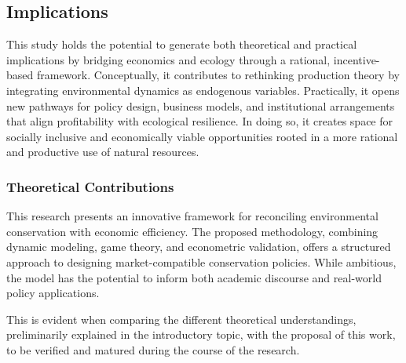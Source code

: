 \subsection{Implications}

This study holds the potential to generate both theoretical and practical implications by bridging economics and ecology through a rational, incentive-based framework. Conceptually, it contributes to rethinking production theory by integrating environmental dynamics as endogenous variables. Practically, it opens new pathways for policy design, business models, and institutional arrangements that align profitability with ecological resilience. In doing so, it creates space for socially inclusive and economically viable opportunities rooted in a more rational and productive use of natural resources.

\subsubsection{Theoretical Contributions}

This research presents an innovative framework for reconciling environmental conservation with economic efficiency. The proposed methodology, combining dynamic modeling, game theory, and econometric validation, offers a structured approach to designing market-compatible conservation policies. While ambitious, the model has the potential to inform both academic discourse and real-world policy applications.

This is evident when comparing the different theoretical understandings, preliminarily explained in the introductory topic, with the proposal of this work, to be verified and matured during the course of the research.

\renewcommand{\arraystretch}{1.3}

